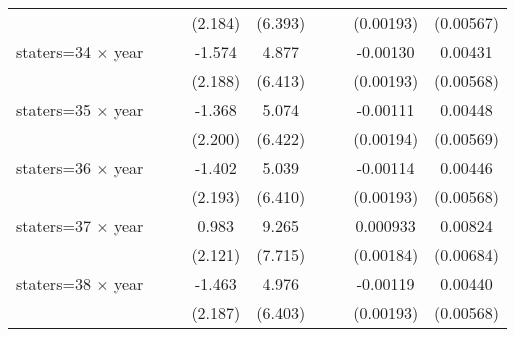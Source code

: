{\begin{longtable}{l*{8}{c}}
                    &                     &                     &     (2.184)         &     (6.393)         &                     &                     &   (0.00193)         &   (0.00567)         \\
[1em]
staters=34 $\times$ year&                     &                     &      -1.574         &       4.877         &                     &                     &    -0.00130         &     0.00431         \\
                    &                     &                     &     (2.188)         &     (6.413)         &                     &                     &   (0.00193)         &   (0.00568)         \\
[1em]
staters=35 $\times$ year&                     &                     &      -1.368         &       5.074         &                     &                     &    -0.00111         &     0.00448         \\
                    &                     &                     &     (2.200)         &     (6.422)         &                     &                     &   (0.00194)         &   (0.00569)         \\
[1em]
staters=36 $\times$ year&                     &                     &      -1.402         &       5.039         &                     &                     &    -0.00114         &     0.00446         \\
                    &                     &                     &     (2.193)         &     (6.410)         &                     &                     &   (0.00193)         &   (0.00568)         \\
[1em]
staters=37 $\times$ year&                     &                     &       0.983         &       9.265         &                     &                     &    0.000933         &     0.00824         \\
                    &                     &                     &     (2.121)         &     (7.715)         &                     &                     &   (0.00184)         &   (0.00684)         \\
[1em]
staters=38 $\times$ year&                     &                     &      -1.463         &       4.976         &                     &                     &    -0.00119         &     0.00440         \\
                    &                     &                     &     (2.187)         &     (6.403)         &                     &                     &   (0.00193)         &   (0.00568)         \\

\end{longtable}}
